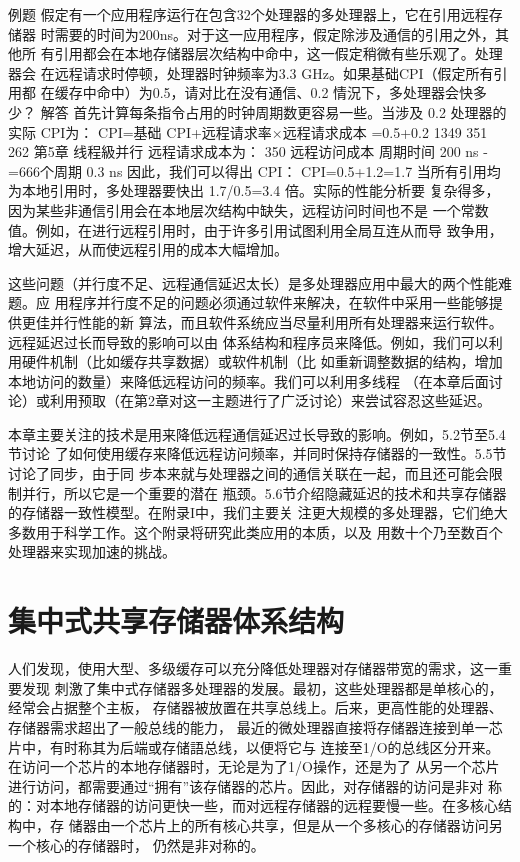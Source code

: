 例题
假定有一个应用程序运行在包含32个处理器的多处理器上，它在引用远程存储器
时需要的时间为200ns。对于这一应用程序，假定除涉及通信的引用之外，其他所
有引用都会在本地存储器层次结构中命中，这一假定稍微有些乐观了。处理器会
在远程请求时停顿，处理器时钟频率为3.3 GHz。如果基础CPI（假定所有引用都
在缓存中命中）为0.5，请对比在没有通信、0.2%
情況下，多处理器会快多少？
解答
首先计算每条指令占用的时钟周期数更容易一些。当涉及 0.2%
处理器的实际 CPI为：
CPI=基础 CPI+远程请求率×远程请求成本
=0.5+0.2%
1349
351
262
第5章 线程級并行
远程请求成本为：
350
远程访问成本
周期时间
200 ns
-=666个周期
0.3 ns
因此，我们可以得出 CPI：
CPI=0.5+1.2=1.7
当所有引用均为本地引用时，多处理器要快出 1.7/0.5=3.4 倍。实际的性能分析要
复杂得多，因为某些非通信引用会在本地层次结构中缺失，远程访问时间也不是
一个常数值。例如，在进行远程引用时，由于许多引用试图利用全局互连从而导
致争用，增大延迟，从而使远程引用的成本大幅增加。

这些问题（并行度不足、远程通信延迟太长）是多处理器应用中最大的两个性能难题。应
用程序并行度不足的问题必须通过软件来解决，在软件中采用一些能够提供更佳并行性能的新
算法，而且软件系统应当尽量利用所有处理器来运行软件。远程延迟过长而导致的影响可以由
体系结构和程序员来降低。例如，我们可以利用硬件机制（比如缓存共享数据）或软件机制（比
如重新调整数据的结构，增加本地访问的数量）来降低远程访问的频率。我们可以利用多线程
（在本章后面讨论）或利用预取（在第2章对这一主题进行了广泛讨论）来尝试容忍这些延迟。

本章主要关注的技术是用来降低远程通信延迟过长导致的影响。例如，5.2节至5.4节讨论
了如何使用缓存来降低远程访问频率，并同时保持存储器的一致性。5.5节讨论了同步，由于同
步本来就与处理器之间的通信关联在一起，而且还可能会限制并行，所以它是一个重要的潜在
瓶颈。5.6节介绍隐藏延迟的技术和共享存储器的存储器一致性模型。在附录I中，我们主要关
注更大规模的多处理器，它们绝大多数用于科学工作。这个附录将研究此类应用的本质，以及
用数十个乃至数百个处理器来实现加速的挑战。

\section{集中式共享存储器体系结构}
人们发现，使用大型、多级缓存可以充分降低处理器对存储器带宽的需求，这一重要发现
刺激了集中式存储器多处理器的发展。最初，这些处理器都是单核心的，经常会占据整个主板，
存储器被放置在共享总线上。后来，更高性能的处理器、存储器需求超出了一般总线的能力，
最近的微处理器直接将存储器连接到单一芯片中，有时称其为后端或存储語总线，以便将它与
连接至1/O的总线区分开来。在访问一个芯片的本地存储器时，无论是为了1/O操作，还是为了
从另一个芯片进行访问，都需要通过“拥有”该存储器的芯片。因此，对存储器的访问是非对
称的：对本地存储器的访问更快一些，而对远程存储器的远程要慢一些。在多核心结构中，存
储器由一个芯片上的所有核心共享，但是从一个多核心的存储器访问另一个核心的存储器时，
仍然是非对称的。

